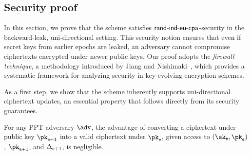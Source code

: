 \documentclass{fundam}
\begin{document}
\subsection{Security proof}
%
In this section, we prove that the scheme satisfies $\mathsf{rand}{\text{-}}\mathsf{ind}{\text{-}}\mathsf{eu}{\text{-}}\mathsf{cpa}$-security in the backward-leak, uni-directional setting. This security notion ensures that even if secret keys from earlier epochs are leaked, an adversary cannot compromise ciphertexts encrypted under newer public keys. Our proof adopts the \emph{firewall technique}, a methodology introduced by Jiang and Nishimaki~\cite{jiang2020,nishimaki2022direction}, which provides a systematic framework for analyzing security in key-evolving encryption schemes.

As a first step, we show that the scheme inherently supports uni-directional ciphertext updates, an essential property that follows directly from its security guarantees.

\begin{theorem}
	For any PPT adversary $\adv$, the advantage of converting a ciphertext under public key $\pk_{\epoch+1}$ into a valid ciphertext under $\pk_{\epoch}$, given access to $(\sk_{\epoch}, \pk_{\epoch})$, $\pk_{\epoch+1}$, and $\Delta_{\mathsf{e}+1}$, is negligible.
\end{theorem}
\end{document}
